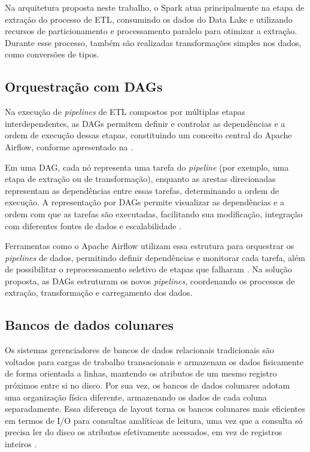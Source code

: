 Na arquitetura proposta neste
trabalho, o Spark atua principalmente na etapa de extração do processo de ETL, consumindo 
os dados do Data Lake e utilizando recursos de particionamento e processamento paralelo 
para otimizar a extração. Durante esse processo, também são realizadas transformações 
simples nos dados, como conversões de tipos.

\subsection{Orquestração com DAGs}

Na execução de \textit{pipelines} de ETL compostos por múltiplas etapas interdependentes, 
as DAGs permitem definir e controlar as dependências e a ordem de execução dessas etapas, 
constituindo um conceito central do Apache Airflow, conforme apresentado na 
. 

Em uma DAG, cada nó representa uma tarefa do \textit{pipeline} (por exemplo, uma etapa de 
extração ou de transformação), enquanto as arestas direcionadas representam as dependências 
entre essas tarefas, determinando a ordem de execução. A representação por DAGs permite
visualizar as dependências e a ordem com que as tarefas são executadas, facilitando sua 
modificação, integração com diferentes fontes de dados e escalabilidade \cite{eeti2022efficient}.

Ferramentas como o Apache Airflow utilizam essa estrutura para orquestrar os
\textit{pipelines} de dados, permitindo definir dependências e monitorar cada tarefa,
além de possibilitar o reprocessamento seletivo de etapas que falharam \cite{eeti2022efficient}.
Na solução proposta, as DAGs estruturam os novos \textit{pipelines}, coordenando os processos 
de extração, transformação e carregamento dos dados.

\subsection{Bancos de dados colunares}

Os sistemas gerenciadores de bancos de dados relacionais tradicionais são voltados 
para cargas de trabalho transacionais e armazenam os dados fisicamente de forma orientada 
a linhas, mantendo os atributos de um mesmo registro próximos entre si no disco. 
Por sua vez, os bancos de dados colunares adotam uma organização física diferente, armazenando 
os dados de cada coluna separadamente. Essa diferença de layout torna os
bancos colunares mais eficientes em termos de I/O para consultas analíticas de
leitura, uma vez que a consulta só precisa ler do disco os atributos
efetivamente acessados, em vez de registros inteiros \cite{abadi2008column}.

